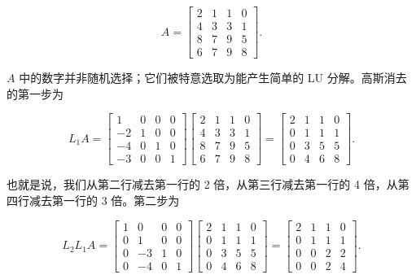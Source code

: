 \documentclass[UTF8,fontset=none,12pt]{ctexart}
\theoremstyle{definition}
\begin{document}
\begin{equation}
A=
\begin{bmatrix}
2&1&1&0\\
4&3&3&1\\
8&7&9&5\\
6&7&9&8
\end{bmatrix}.
\tag{20.3}
\end{equation}

$A$ 中的数字并非随机选择；它们被特意选取为能产生简单的 LU 分解。高斯消去的第一步为

\begin{equation*}
L_1A=
\begin{bmatrix}
1&0&0&0\\
-2&1&0&0\\
-4&0&1&0\\
-3&0&0&1
\end{bmatrix}
\begin{bmatrix}
2&1&1&0\\
4&3&3&1\\
8&7&9&5\\
6&7&9&8
\end{bmatrix}
=
\begin{bmatrix}
2&1&1&0\\
0&1&1&1\\
0&3&5&5\\
0&4&6&8
\end{bmatrix}.
\end{equation*}

也就是说，我们从第二行减去第一行的 2 倍，从第三行减去第一行的 4 倍，从第四行减去第一行的 3 倍。第二步为

\begin{equation*}
L_2L_1A=
\begin{bmatrix}
1&0&0&0\\
0&1&0&0\\
0&-3&1&0\\
0&-4&0&1
\end{bmatrix}
\begin{bmatrix}
2&1&1&0\\
0&1&1&1\\
0&3&5&5\\
0&4&6&8
\end{bmatrix}
=
\begin{bmatrix}
2&1&1&0\\
0&1&1&1\\
0&0&2&2\\
0&0&2&4
\end{bmatrix}.
\end{equation*}
\end{document}
